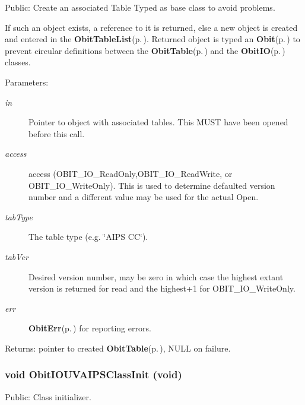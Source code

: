 Public: Create an associated Table Typed as base class to avoid problems. 

If such an object exists, a reference to it is returned, else a new object is created and entered in the {\bf Obit\-Table\-List}{\rm (p.\,\pageref{structObitTableList})}. Returned object is typed an {\bf Obit}{\rm (p.\,\pageref{structObit})} to prevent circular definitions between the {\bf Obit\-Table}{\rm (p.\,\pageref{structObitTable})} and the {\bf Obit\-IO}{\rm (p.\,\pageref{structObitIO})} classes. \begin{Desc}
\item[Parameters:]
\begin{description}
\item[{\em in}]Pointer to object with associated tables. This MUST have been opened before this call. \item[{\em access}]access (OBIT\_\-IO\_\-Read\-Only,OBIT\_\-IO\_\-Read\-Write, or OBIT\_\-IO\_\-Write\-Only). This is used to determine defaulted version number and a different value may be used for the actual Open. \item[{\em tab\-Type}]The table type (e.g. \char`\"{}AIPS CC\char`\"{}). \item[{\em tab\-Ver}]Desired version number, may be zero in which case the highest extant version is returned for read and the highest+1 for OBIT\_\-IO\_\-Write\-Only. \item[{\em err}]{\bf Obit\-Err}{\rm (p.\,\pageref{structObitErr})} for reporting errors. \end{description}
\end{Desc}
\begin{Desc}
\item[Returns:]pointer to created {\bf Obit\-Table}{\rm (p.\,\pageref{structObitTable})}, NULL on failure. \end{Desc}
\subsubsection{\setlength{\rightskip}{0pt plus 5cm}void Obit\-IOUVAIPSClass\-Init (void)}\label{ObitIOUVAIPS_8c_a33}


Public: Class initializer. 

